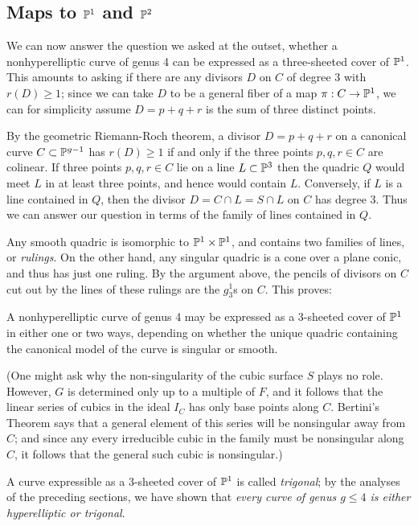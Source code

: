 \subsection{Maps to $\PP^1$ and $\PP^2$}

We can now answer the question we asked at the outset, whether a nonhyperelliptic curve of genus 4 can be expressed as a three-sheeted cover of $\PP^1$. This amounts to asking if there are any divisors $D$ on $C$ of degree 3 with $r(D) \geq 1$; since we can take $D$ to be a general fiber of a map $\pi : C \to \PP^1$, we can for simplicity assume $D = p+q+r$ is the sum of three distinct points.

By the geometric Riemann-Roch theorem, a divisor $D = p+q+r$ on a canonical curve $C \subset \PP^{g-1}$ has $r(D) \geq 1$ if and only if the three points $p,q,r \in C$ are colinear. If three points $p,q,r \in C$ lie on a line $L \subset \PP^3$ then the quadric $Q$ would meet $L$ in at least three points, and hence would contain $L$. Conversely,  if $L$ is a line contained in $Q$, then the divisor $D = C \cap L = S \cap L$ on $C$ has degree  3. Thus we can answer our question in terms of the family of lines contained in $Q$.

Any smooth quadric is isomorphic to $\PP^1\times \PP^1$, and contains two families of lines, or \emph{rulings}. On the other hand, any singular quadric is a cone over a plane conic, and thus has just one ruling. By the argument above, the pencils of divisors on $C$ cut out by the lines of these rulings are the $g^1_3$s on $C$. This proves:

\begin{proposition}\label{genus 4 trigonal}
A nonhyperelliptic curve of genus 4 may be expressed as a 3-sheeted cover of $\PP^1$ in either one or two ways, depending on whether the unique quadric containing the canonical model of the curve is singular or smooth.
\end{proposition}

 (One might ask why the non-singularity of the cubic surface $S$ plays no role. However, $G$ is determined only up to a multiple of $F$, and it follows that the linear series of cubics in the ideal
$I_C$ has only base points along $C$. Bertini's Theorem says that a general element of this series will be nonsingular away from $C$; and since any every irreducible cubic in the family must be nonsingular along $C$, it follows that the general such cubic is nonsingular.)

A curve expressible as a 3-sheeted cover of $\PP^1$ is called \emph{trigonal}; by the analyses of the preceding sections, we have shown that \emph{every curve of genus $g \leq 4$ is either hyperelliptic or trigonal}. 

